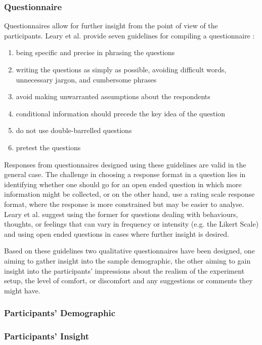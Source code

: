 \subsubsection{Questionnaire}
Questionnaires allow for further insight from the point of view of the participants. Leary et al. provide seven guidelines for compiling a questionnaire \cite{introductiontobehavioralresearchmethods}:
\begin{enumerate}
	\item being specific and precise in phrasing the questions
	\item writing the questions as simply as possible, avoiding difficult words, unnecessary jargon, and cumbersome phrases
	\item avoid making unwarranted assumptions about the respondents
	\item conditional information should precede the key idea of the question
	\item do not use double-barrelled questions
	\item pretest the questions
\end{enumerate}
Responses from questionnaires designed using these guidelines are valid in the general case. The challenge in choosing a response format in a question lies in identifying whether one should go for an open ended question in which more information might be collected, or on the other hand, use a rating scale response format, where the response is more constrained but may be easier to analyse. Leary et al. suggest using the former for questions dealing with behaviours, thoughts, or feelings that can vary in frequency or intensity (e.g. the Likert Scale\cite{likert1932technique}) and using open ended questions in cases where further insight is desired.

Based on these guidelines two qualitative questionnaires have been designed, one aiming to gather insight into the sample demographic, the other aiming to gain insight into the participants' impressions about the realism of the experiment setup, the level of comfort, or discomfort and any suggestions or comments they might have. 

\subsubsection{Participants' Demographic}

\subsubsection{Participants' Insight}

